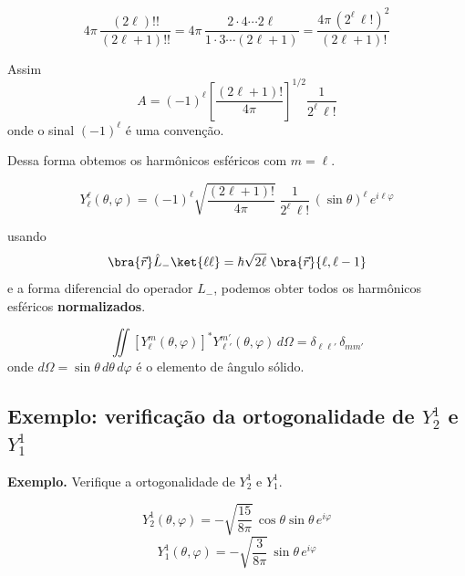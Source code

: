 \begin{equation}
    4\pi\,\frac{(2\ell)!!}{(2\ell+1)!!} = 4\pi\,\frac{2\cdot4\cdots2\ell}{1\cdot3\cdots(2\ell+1)} = \frac{4\pi\,(2^\ell\,\ell!)^2}{(2\ell+1)!}
\label{eq:aula20_normalizacao_dupla_fatorial}
\end{equation}

Assim
\begin{equation}
    A = (-1)^\ell \left[ \frac{(2\ell+1)!}{4\pi} \right]^{1/2} \frac{1}{2^\ell\,\ell!}
\label{eq:aula20_constante_A}
\end{equation}
onde o sinal $(-1)^\ell$ é uma convenção.

Dessa forma obtemos os harmônicos esféricos com $m = \ell$.

\begin{equation}
    \boxed{Y_\ell^\ell(\theta,\varphi) = (-1)^\ell \sqrt{\frac{(2\ell+1)!}{4\pi}} \; \frac{1}{2^\ell\,\ell!}\, (\sin\theta)^\ell\, e^{i\ell\varphi}}
\label{eq:aula20_Yll_final}
\end{equation}

usando
\begin{equation}
    \bra{\vec{r}} \hat{L}_- \ket{\ell\ell} = \hbar\sqrt{2\ell}\;\bra{\vec{r}}{\ell,\ell-1}
\label{eq:aula20_Lminus_recorrencia}
\end{equation}
e a forma diferencial do operador $\hat{L}_-$, podemos obter todos os harmônicos esféricos \textbf{normalizados}.

\begin{equation}
    \iint \left[Y_\ell^m(\theta,\varphi)\right]^* Y_{\ell'}^{m'}(\theta,\varphi) \, d\Omega = \delta_{\ell\ell'}\,\delta_{mm'}
\label{eq:aula20_normalizacao_geral_Y}
\end{equation}
onde $d\Omega = \sin\theta\,d\theta\,d\varphi$ é o elemento de ângulo sólido.

\subsection*{Exemplo: verificação da ortogonalidade de $Y_2^1$ e $Y_1^1$}

\textbf{Exemplo.} Verifique a ortogonalidade de $Y_2^1$ e $Y_1^1$.

\begin{equation}
    Y_2^1(\theta,\varphi) = -\sqrt{\frac{15}{8\pi}}\,\cos\theta\sin\theta\, e^{i\varphi}
\label{eq:aula20_Y21}
\end{equation}
\begin{equation}
    Y_1^1(\theta,\varphi) = -\sqrt{\frac{3}{8\pi}}\,\sin\theta\, e^{i\varphi}
\label{eq:aula20_Y11}
\end{equation}

